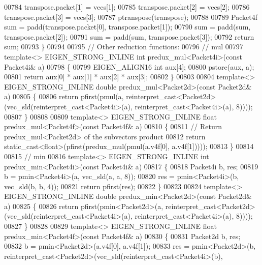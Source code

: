 \begin{DoxyCode}
{00784   transpose.packet[1] = vecs[1];
00785   transpose.packet[2] = vecs[2];
00786   transpose.packet[3] = vecs[3];
00787   ptranspose(transpose);
00788 
00789   Packet4f sum = padd(transpose.packet[0], transpose.packet[1]);
00790   sum = padd(sum, transpose.packet[2]);
00791   sum = padd(sum, transpose.packet[3]);
00792   \textcolor{keywordflow}{return} sum;
00793 \}
00794 
00795 \textcolor{comment}{// Other reduction functions:}
00796 \textcolor{comment}{// mul}
00797 \textcolor{keyword}{template}<> EIGEN\_STRONG\_INLINE \textcolor{keywordtype}{int} predux\_mul<Packet4i>(\textcolor{keyword}{const} Packet4i& a)
00798 \{
00799   EIGEN\_ALIGN16 \textcolor{keywordtype}{int} aux[4];
00800   pstore(aux, a);
00801   \textcolor{keywordflow}{return} aux[0] * aux[1] * aux[2] * aux[3];
00802 \}
00803 
00804 \textcolor{keyword}{template}<> EIGEN\_STRONG\_INLINE \textcolor{keywordtype}{double} predux\_mul<Packet2d>(\textcolor{keyword}{const} Packet2d& a)
00805 \{
00806   \textcolor{keywordflow}{return} pfirst(pmul(a, reinterpret\_cast<Packet2d>(vec\_sld(reinterpret\_cast<Packet4i>(a), 
      reinterpret\_cast<Packet4i>(a), 8))));
00807 \}
00808 
00809 \textcolor{keyword}{template}<> EIGEN\_STRONG\_INLINE \textcolor{keywordtype}{float} predux\_mul<Packet4f>(\textcolor{keyword}{const} Packet4f& a)
00810 \{
00811   \textcolor{comment}{// Return predux\_mul<Packet2d> of the subvectors product}
00812   \textcolor{keywordflow}{return} \textcolor{keyword}{static\_cast<}\textcolor{keywordtype}{float}\textcolor{keyword}{>}(pfirst(predux\_mul(pmul(a.v4f[0], a.v4f[1]))));
00813 \}
00814 
00815 \textcolor{comment}{// min}
00816 \textcolor{keyword}{template}<> EIGEN\_STRONG\_INLINE \textcolor{keywordtype}{int} predux\_min<Packet4i>(\textcolor{keyword}{const} Packet4i& a)
00817 \{
00818   Packet4i b, res;
00819   b   = pmin<Packet4i>(a, vec\_sld(a, a, 8));
00820   res = pmin<Packet4i>(b, vec\_sld(b, b, 4));
00821   \textcolor{keywordflow}{return} pfirst(res);
00822 \}
00823 
00824 \textcolor{keyword}{template}<> EIGEN\_STRONG\_INLINE \textcolor{keywordtype}{double} predux\_min<Packet2d>(\textcolor{keyword}{const} Packet2d& a)
00825 \{
00826   \textcolor{keywordflow}{return} pfirst(pmin<Packet2d>(a, reinterpret\_cast<Packet2d>(vec\_sld(reinterpret\_cast<Packet4i>(a), 
      reinterpret\_cast<Packet4i>(a), 8))));
00827 \}
00828 
00829 \textcolor{keyword}{template}<> EIGEN\_STRONG\_INLINE \textcolor{keywordtype}{float} predux\_min<Packet4f>(\textcolor{keyword}{const} Packet4f& a)
00830 \{
00831   Packet2d b, res;
00832   b   = pmin<Packet2d>(a.v4f[0], a.v4f[1]);
00833   res = pmin<Packet2d>(b, \textcolor{keyword}{reinterpret\_cast<}Packet2d\textcolor{keyword}{>}(vec\_sld(reinterpret\_cast<Packet4i>(b), 
}
\end{DoxyCode}
